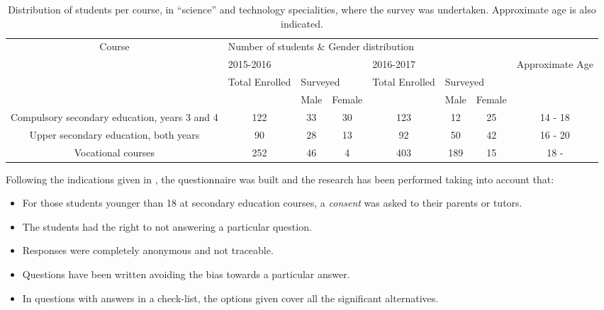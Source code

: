 \documentclass[journal,transmag]{IEEEtran}
\begin{document}
\begin{table}
  \caption[Students who undertook the surveys]{Distribution of students per course, in ``science'' and technology specialities, where the survey was undertaken. Approximate age is also indicated.}
  \label{tab:muestra}

  \begin{center}
    \begin{tabular}{|c|c|c|c|c|c|c|c|}
    	\hline
    	\multirow{4}{*}{Course} & \multicolumn{7}{l|}{Number of students \& Gender distribution} \\ \cline{2-8}
    	& \multicolumn{3}{l|}{2015-2016} & \multicolumn{3}{l|}{2016-2017} & \multirow{3}{*}{Approximate Age} \\ \cline{2-7}
    	& \multirow{2}{*}{Total Enrolled} & \multicolumn{2}{l|}{Surveyed} & \multirow{2}{*}{Total Enrolled} & \multicolumn{2}{l|}{Surveyed} & \\ \cline{3-4} \cline{6-7}
    	& & Male & Female & & Male & Female & \\ \hline
    	Compulsory secondary education, years 3 and 4 & 122 & 33 & 30 & 123 & 12  & 25 & 14 - 18 \\ \hline
    	Upper secondary education, both years         & 90  & 28 & 13 & 92  & 50  & 42 & 16 - 20 \\ \hline
    	Vocational courses                            & 252 & 46 & 4  & 403 & 189 & 15 & 18 -    \\ \hline
    \end{tabular}
  \end{center}
\end{table}

Following the indications given in \cite{cohen2013research}, the questionnaire was built and the research has been performed taking into account that:

\begin{itemize}
  \item For those students younger than 18 at secondary education courses, a \textit{consent} was asked to their parents or tutors.
  \item The students had the right to not answering a particular question.
  \item Responses were completely anonymous and not traceable.
  \item Questions have been written avoiding the bias towards a particular answer.
  \item In questions with answers in a check-list, the options given cover all the significant alternatives.
\end{itemize}
\end{document}
